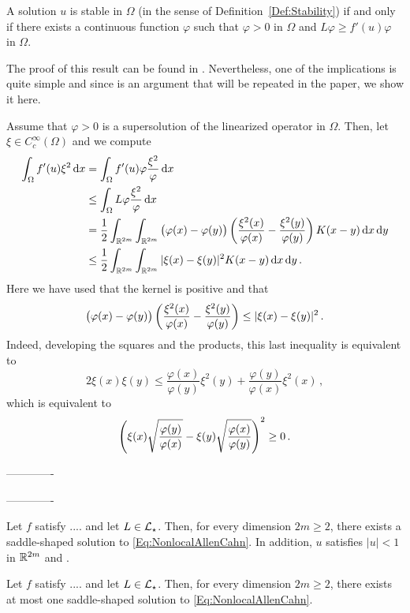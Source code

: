 \begin{lemma}
	\label{Lemma:EquivalenceStability}
	A solution $u$ is stable in $\Omega$ (in the sense of Definition~\ref{Def:Stability}) if and only if there exists a continuous function $\varphi$ such that $\varphi > 0$ in $\Omega$ and $L\varphi \geq f'(u) \varphi$ in $\Omega$.
\end{lemma}

The proof of this result can be found in \cite{HamelRosOtonSireValdinoci}. Nevertheless, one of the implications is quite simple and since is an argument that will be repeated in the paper, we show it here. 

Assume that $\varphi > 0$ is a supersolution of the linearized operator in $\Omega$. Then, let $\xi \in C^\infty_c (\Omega)$ and we compute
\begin{align*}
	\int_\Omega f'(u) \xi^2 \,\mathrm{d} x &= \int_\Omega f'(u) \varphi \dfrac{\xi^2}{\varphi} \,\mathrm{d} x \\
	&\leq \int_\Omega L\varphi \dfrac{\xi^2}{\varphi}  \,\mathrm{d} x \\ 
	&= \dfrac{1}{2} \int_{\mathbb{R}^{2m}} \int_{\mathbb{R}^{2m}} \big ( \varphi(x) - \varphi(y) \big) \left ( {\dfrac{\xi^2(x)}{\varphi(x)} - \dfrac{\xi^2(y)}{\varphi(y)} }\right ) K(x - y) \,\mathrm{d} x \,\mathrm{d} y
	 \\ 
	&\leq \dfrac{1}{2} \int_{\mathbb{R}^{2m}} \int_{\mathbb{R}^{2m}} |\xi (x) - \xi(y)|^2 K(x - y) \,\mathrm{d} x \,\mathrm{d} y\,.
\end{align*}
Here we have used that the kernel is positive and that
$$
\big ( \varphi(x) - \varphi(y) \big) \left ( {\dfrac{\xi^2(x)}{\varphi(x)} - \dfrac{\xi^2(y)}{\varphi(y)} }\right ) \leq |\xi (x) - \xi(y)|^2\,.
$$
Indeed, developing the squares and the products, this last inequality is equivalent to
$$
2 \xi(x) \xi(y) \leq \dfrac{\varphi(x)}{\varphi(y)} \xi^2(y) +  \dfrac{\varphi(y)}{\varphi(x)} \xi^2 (x)\,,
$$
which is equivalent to
$$
\left ( {\xi (x)\sqrt{\dfrac{\varphi(y)}{\varphi(x)}} - \xi(y) \sqrt{\dfrac{\varphi(x)}{\varphi(y)} } }\right )^2 \geq 0\,.
$$


\bigskip
\bigskip
\bigskip
-------------
\bigskip
\bigskip
\bigskip


\bigskip
\bigskip
\bigskip
-------------
\bigskip
\bigskip
\bigskip

\begin{theorem}
	\label{Th:Existence}
    Let $f$ satisfy .... and let $L\in \mathcal{L}_\star$. Then, for every dimension $2m \geq 2$, there exists a saddle-shaped solution to \eqref{Eq:NonlocalAllenCahn}. In addition, $u$ satisfies $|u|<1$ in $\mathbb{R}^{2m}$ and .
\end{theorem}


\begin{theorem}
	\label{Th:Uniqueness}
    Let $f$ satisfy .... and let $L\in \mathcal{L}_\star$. Then, for every dimension $2m \geq 2$, there exists at most one saddle-shaped solution to \eqref{Eq:NonlocalAllenCahn}.
\end{theorem}

